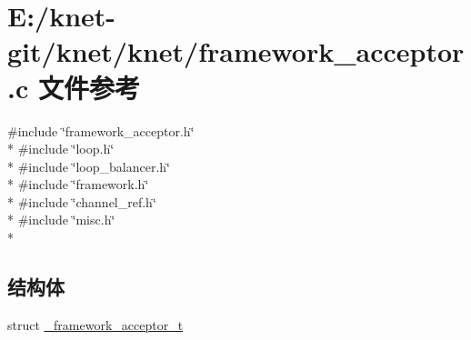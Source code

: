 \hypertarget{a00050}{}\section{E\+:/knet-\/git/knet/knet/framework\+\_\+acceptor.c 文件参考}
\label{a00050}
{\ttfamily \#include \char`\"{}framework\+\_\+acceptor.\+h\char`\"{}}\\*
{\ttfamily \#include \char`\"{}loop.\+h\char`\"{}}\\*
{\ttfamily \#include \char`\"{}loop\+\_\+balancer.\+h\char`\"{}}\\*
{\ttfamily \#include \char`\"{}framework.\+h\char`\"{}}\\*
{\ttfamily \#include \char`\"{}channel\+\_\+ref.\+h\char`\"{}}\\*
{\ttfamily \#include \char`\"{}misc.\+h\char`\"{}}\\*
\subsection*{结构体}
\begin{DoxyCompactItemize}
\item 
struct \hyperlink{a00009}{\+\_\+framework\+\_\+acceptor\+\_\+t}
\end{DoxyCompactItemize}

